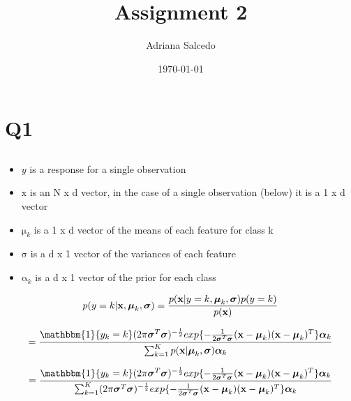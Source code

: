 \documentclass[12pt,letterpaper]{article} %
\title{\Large Assignment 2}
\author{\large Adriana Salcedo}
\date{\large \today}
\newcommand{\bs}[1]{\bm{\mathrm{#1}}} %
\newcommand{\switch}[0]{\mathbbm{1}\{y_k=k\}}
\begin{document}
\maketitle

\section{Q1}

\subsection{}
 \begin{itemize}
 \item $y$ is a response for a single observation
  \item $\bs{x}$ is an N x d vector, in the case of a single observation (below) it is a 1 x d vector
  \item $\bs{\mu}_k$ is a 1 x d vector of the means of each feature for class k 
  \item $\bs{\sigma}$ is a d x 1 vector of the variances of each feature
  \item $\bs{\alpha}_k$ is a d x 1 vector of the prior for each class
 \end{itemize}


\begin{equation*}
 p(y=k | \bs{x},\bs{\mu}_k, \bs{\sigma}) = \frac{p(\bs{x}|y=k,\bs{\mu}_k,\bs{\sigma})p(y=k)}{p(\bs{x})} \\
\end{equation*}
 
\begin{equation*}
 =\frac{ \switch(2\pi\bs{\sigma}^T\bs{\sigma})^{-\frac{1}{2}}exp\{-\frac{1}{2\bs{\sigma}^T\bs{\sigma}}(\bs{x}-\bs{\mu}_k)(\bs{x}-\bs{\mu}_k)^T\}\bs{\alpha}_k}{\sum_{k=1}^K p(\bs{x} | \bs{\mu}_k, \bs{\sigma})\bs{\alpha}_k}
\end{equation*}

\begin{equation*}
 = \frac{ \switch(2\pi\bs{\sigma}^T\bs{\sigma})^{-\frac{1}{2}}exp\{-\frac{1}{2\bs{\sigma}^T\bs{\sigma}}(\bs{x}-\bs{\mu}_k)(\bs{x}-\bs{\mu}_k)^T\}\bs{\alpha}_k}{\sum_{k=1}^K (2\pi\bs{\sigma}^T\bs{\sigma})^{-\frac{1}{2}}exp\{-\frac{1}{2\bs{\sigma}^T\bs{\sigma}}(\bs{x}-\bs{\mu}_k)(\bs{x}-\bs{\mu}_k)^T\}\bs{\alpha}_k}
\end{equation*}

\subsection{}
\end{document}
